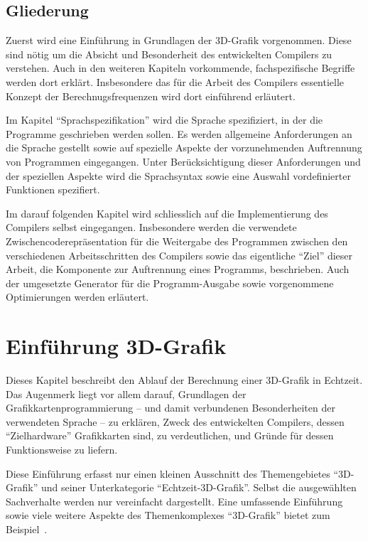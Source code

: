 \documentclass[twoside,a4paper,fleqn,12pt]{book}
\begin{document}

\section{Gliederung}

Zuerst wird eine Einführung in Grundlagen der 3D-Grafik vorgenommen. Diese sind nötig um die Absicht und Besonderheit des entwickelten Compilers zu verstehen.
Auch in den weiteren Kapiteln vorkommende, fachspezifische Begriffe werden dort erklärt. Insbesondere das für die Arbeit des Compilers essentielle Konzept
der Berechnugsfrequenzen wird dort einführend erläutert.

Im Kapitel "`Sprachspezifikation"' wird die Sprache spezifiziert, in der die Programme geschrieben werden sollen.
Es werden allgemeine Anforderungen an die Sprache gestellt sowie auf spezielle Aspekte der vorzunehmenden Auftrennung von Programmen eingegangen.
Unter Berücksichtigung dieser Anforderungen und der speziellen Aspekte wird die Sprachsyntax sowie eine Auswahl vordefinierter Funktionen spezifiert.

Im darauf folgenden Kapitel wird schliesslich auf die Implementierung des Compilers selbst eingegangen. Insbesondere werden die verwendete Zwischencoderepräsentation
für die Weitergabe des Programmen zwischen den verschiedenen Arbeitsschritten des Compilers sowie das eigentliche "`Ziel"' dieser Arbeit,
die Komponente zur Auftrennung eines Programms, beschrieben. Auch der umgesetzte Generator für die Programm-Ausgabe sowie vorgenommene Optimierungen
werden erläutert.


\chapter{Einführung 3D-Grafik}

Dieses Kapitel beschreibt den Ablauf der Berechnung einer 3D-Grafik in Echtzeit.
Das Augenmerk liegt vor allem darauf, Grundlagen der Grafikkartenprogrammierung -- und damit verbundenen
Besonderheiten der verwendeten Sprache -- zu erklären, Zweck des entwickelten Compilers, dessen "`Zielhardware"' Grafikkarten sind,
zu verdeutlichen, und Gründe für dessen Funktionsweise zu liefern.

Diese Einführung erfasst nur einen kleinen Ausschnitt des Themengebietes "`3D-Grafik"' und seiner Unterkategorie
"`Echtzeit-3D-Grafik"'. Selbst die ausgewählten Sachverhalte werden nur vereinfacht dargestellt.
Eine umfassende Einführung sowie viele weitere Aspekte des Themenkomplexes "`3D-Grafik"' bietet zum Beispiel~\cite{watt_de}.
\end{document}
